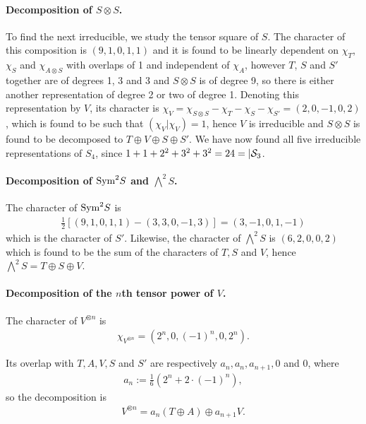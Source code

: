 \begin{example}
	\paragraph{Decomposition of $S \otimes S$.} To find the next irreducible, we study the tensor square of $S$. The character of this composition is $(9,1,0,1,1)$ and it is found to be linearly dependent on $\chi_T$,  $\chi_S$ and $\chi_{A \otimes S}$ with overlaps of 1 and independent of $\chi_A$, however $T$, $S$ and $S'$ together are of degrees 1, 3 and 3 and $S \otimes S$ is of degree 9, so there is either another representation of degree 2 or two of degree 1. Denoting this representation by $V$, its character is $\chi_V = \chi_{S \otimes S} - \chi_T - \chi_S - \chi_{S'} = (2, 0, -1, 0, 2)$, which is found to be such that $(\chi_V|\chi_V) = 1$, hence $V$ is irreducible and $S \otimes S$ is found to be decomposed to $T \oplus V \oplus S \oplus S'$. We have now found all five irreducible representations of $S_4$, since $1 + 1 +  2^2 + 3^2 + 3^2 = 24 = |\mathcal{S}_3$.
	
	\paragraph{Decomposition of $\text{Sym}^2S$ and $\bigwedge^2S$.} The character of $\text{Sym}^2S$ is 
	\begin{align*}
		\frac{1}{2}\left[ (9,1,0,1,1)-(3,3,0,-1,3) \right] = (3,-1,0,1,-1)
	\end{align*}
	which is the character of $S'$. Likewise, the character of $\bigwedge^2S$ is $(6,2,0,0,2)$ which is found to be the sum of the characters of $T, S$ and $V$, hence $\bigwedge^2S = T \oplus S \oplus V$.
	
	\paragraph{Decomposition of the $n$th tensor power of $V$.}
	
	The character of $V^{\otimes n}$ is
	\begin{align*}
		\chi_{V^{\otimes n}} = (2^n, 0, (-1)^n, 0, 2^n).
	\end{align*}
	
	Its overlap with $T, A, V, S$ and $S'$ are respectively $a_n, a_n, a_{n+1}, 0$ and $0$, where 
	\begin{align*}
		a_n := \frac{1}{6}\left( 2^n + 2 \cdot (-1)^n \right),
	\end{align*}
	so the decomposition is
	\begin{align*}
		V^{\otimes n} = a_n (T \oplus A) \oplus a_{n+1} V.
	\end{align*}
	

\end{example}
